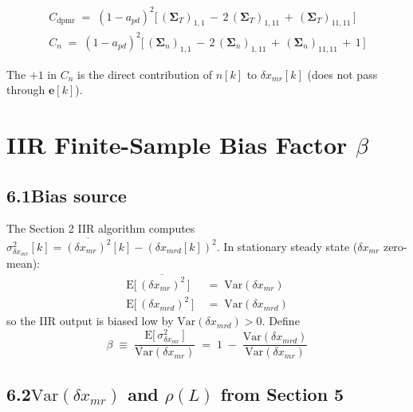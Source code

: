 \documentclass[11pt]{article}
\begin{document}
\begin{gather}
\boxed{\;C_{\mathrm{dpmr}} \;=\; (1-a_{pd})^{2}\bigl[\,
  (\bm{\Sigma}_T)_{1,1} \,-\, 2\,(\bm{\Sigma}_T)_{1,11} \,+\, (\bm{\Sigma}_T)_{11,11}
  \,\bigr]\;} \\[6pt]
\boxed{\;C_{n} \;=\; (1-a_{pd})^{2}\bigl[\,
  (\bm{\Sigma}_n)_{1,1} \,-\, 2\,(\bm{\Sigma}_n)_{1,11} \,+\, (\bm{\Sigma}_n)_{11,11}
  \,+\, 1
  \,\bigr]\;}
\end{gather}

The $+1$ in $C_{n}$ is the direct contribution of $n[k]$ to $\delta x_{mr}[k]$ (does not pass through $\bm{e}[k]$).

\section{IIR Finite-Sample Bias Factor $\beta$}

\subsection*{6.1\quad Bias source}

The Section 2 IIR algorithm computes
$\sigma^{2}_{\delta x_{mr}}[k] = \overline{(\delta x_{mr})^{2}}[k] - (\delta x_{mrd}[k])^{2}$.
In stationary steady state ($\delta x_{mr}$ zero-mean):
\begin{align}
\mathrm{E}\bigl[\,\overline{(\delta x_{mr})^{2}}\,\bigr] &\;=\; \mathrm{Var}(\delta x_{mr}) \\[2pt]
\mathrm{E}\bigl[\,(\delta x_{mrd})^{2}\,\bigr] &\;=\; \mathrm{Var}(\delta x_{mrd})
\end{align}
so the IIR output is biased low by $\mathrm{Var}(\delta x_{mrd}) > 0$. Define
\begin{equation}
\beta \;\equiv\; \frac{\mathrm{E}\!\bigl[\,\sigma^{2}_{\delta x_{mr}}\,\bigr]}{\mathrm{Var}(\delta x_{mr})}
       \;=\; 1 \;-\; \frac{\mathrm{Var}(\delta x_{mrd})}{\mathrm{Var}(\delta x_{mr})}
\end{equation}

\subsection*{6.2\quad $\mathrm{Var}(\delta x_{mr})$ and $\rho(L)$ from Section 5}
\end{document}
